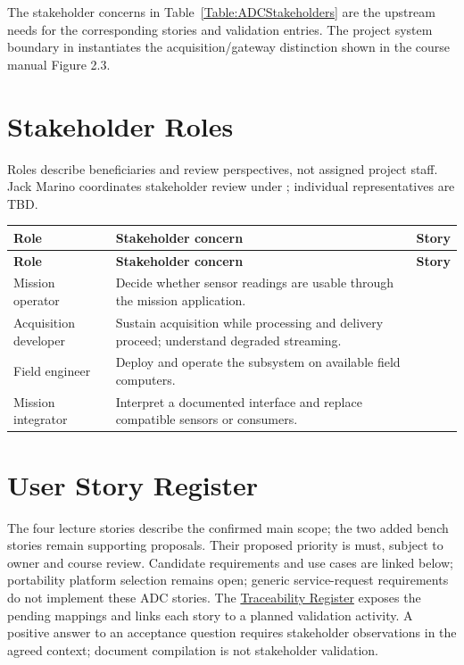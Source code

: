 The stakeholder concerns in Table~\ref{Table:ADCStakeholders} are the upstream needs for the corresponding stories and validation entries. The project system boundary in  instantiates the acquisition/gateway distinction shown in the course manual Figure 2.3.
\section{Stakeholder Roles}
\label{Section:ADCStakeholders}
Roles describe beneficiaries and review perspectives, not assigned project
staff. Jack Marino coordinates stakeholder review under
; individual representatives are TBD.
\begin{tabularx}{\linewidth}{L{3.4cm}Y L{1.7cm}}
\caption{Stakeholder Roles\label{Table:ADCStakeholders}}\\
\toprule
\textbf{Role} & \textbf{Stakeholder concern} & \textbf{Story}\\
\midrule
\endfirsthead
\toprule
\textbf{Role} & \textbf{Stakeholder concern} & \textbf{Story}\\
\midrule
\endhead
\bottomrule
\endlastfoot
Mission operator & Decide whether sensor readings are usable through the mission application. & \\
Acquisition developer & Sustain acquisition while processing and delivery proceed; understand degraded streaming. & \\
Field engineer & Deploy and operate the subsystem on available field computers. & \\
Mission integrator & Interpret a documented interface and replace compatible sensors or consumers. & \\
\end{tabularx}

\section{User Story Register}
\label{Section:ADCUserStories}
The four lecture stories describe the confirmed main scope; the two added bench stories remain supporting proposals. Their proposed priority
is \gls{must}, subject to owner and course review. Candidate requirements and use cases are linked below; portability platform selection remains open; generic service-request
requirements do not implement these ADC stories. The
\hyperref[Table:TraceabilityMatrix]{Traceability Register} exposes the pending
mappings and links each story to a planned validation activity. A positive
answer to an acceptance question requires stakeholder observations in the
agreed context; document compilation is not stakeholder validation.

